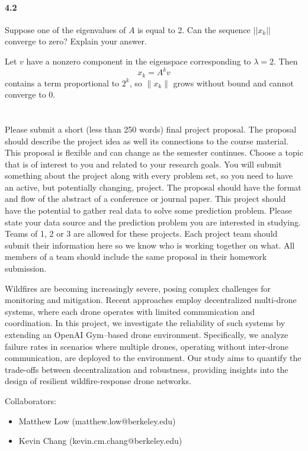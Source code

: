 \documentclass[a4paper]{article}
\begin{document}
\paragraph{4.2}
Suppose one of the eigenvalues of $A$ is equal to 2.
Can the sequence $||x_k||$ converge to zero?
Explain your answer.

Let $v$ have a nonzero component in the eigenspace corresponding to $\lambda=2$. Then
\[
x_k = A^k v
\]
contains a term proportional to $2^k$, so $\|x_k\|$ grows without bound and cannot converge to $0$.


\section{}
Please submit a short (less than 250 words) final project proposal.
The proposal should describe the project idea as well its connections to the course material.
This proposal is flexible and can change as the semester continues.
Choose a topic that is of interest to you and related to your research goals.
You will submit something about the project along with every problem set, so you need to have an active, but potentially changing, project.
The proposal should have the format and flow of the abstract of a conference or journal paper.
This project should have the potential to gather real data to solve some prediction problem.
Please state your data source and the prediction problem you are interested in studying.
Teams of 1, 2 or 3 are allowed for these projects. Each project team should submit their information here so we know who is working together on what. All members of a team should include the same proposal in their homework submission.

Wildfires are becoming increasingly severe, posing complex challenges for monitoring and mitigation. Recent approaches employ decentralized multi-drone systems, where each drone operates with limited communication and coordination. In this project, we investigate the reliability of such systems by extending an OpenAI Gym–based drone environment. Specifically, we analyze failure rates in scenarios where multiple drones, operating without inter-drone communication, are deployed to the environment. Our study aims to quantify the trade-offs between decentralization and robustness, providing insights into the design of resilient wildfire-response drone networks.

Collaborators:
\begin{itemize}
    \item Matthew Low (matthew.low@berkeley.edu)
    \item Kevin Chang (kevin.cm.chang@berkeley.edu)
\end{itemize}
\end{document}
